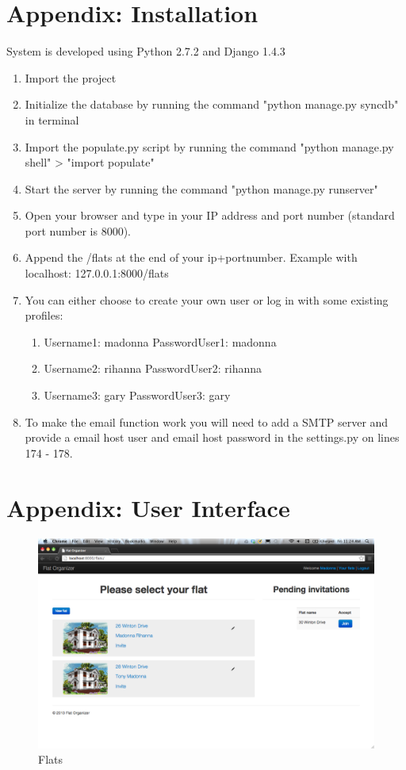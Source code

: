 \documentclass{sig-alt-release2}
\begin{document}
\section{Appendix: Installation}
\noindent System is developed using Python 2.7.2 and Django 1.4.3
\begin{enumerate}
\item Import the project
\item Initialize the database by running the command "python manage.py syncdb" in terminal
\item Import the populate.py script by running the command "python manage.py shell" > "import populate"
\item Start the server by running the command "python manage.py runserver" 
\item Open your browser and type in your IP address and port number (standard port number is 8000).
\item Append the /flats at the end of your ip+portnumber. Example with localhost: 127.0.0.1:8000/flats
\item You can either choose to create your own user or log in with some existing profiles:
\begin{enumerate}
\item Username1: madonna PasswordUser1: madonna
\item Username2: rihanna PasswordUser2: rihanna
\item Username3: gary PasswordUser3: gary
\end{enumerate}
\item To make the email function work you will need to add a SMTP server and provide a email host user and email host password in the settings.py on lines 174 - 178.
\end{enumerate}

\section{Appendix: User Interface}

\begin{figure}[!ht]
\centering
\includegraphics[scale=0.2]{flats_shot}
\caption{Flats}
\label{fig:flats_shot}
\end{figure}
\end{document}
